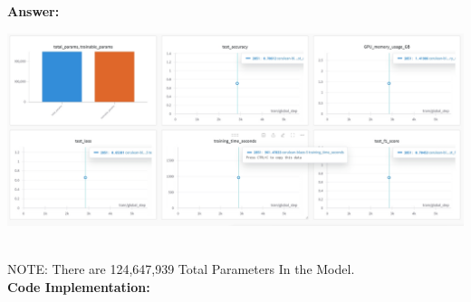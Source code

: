 \documentclass[11pt, oneside]{article}   	%
\begin{document}
\textbf{Answer:} \\
\begin{center}
    \includegraphics[width=\textwidth]{p1p2_pic/RoberTaFT.png}
\end{center}
\\
NOTE: There are 124,647,939 Total Parameters In the Model.
\\
\textbf{Code Implementation: }
\end{document}
